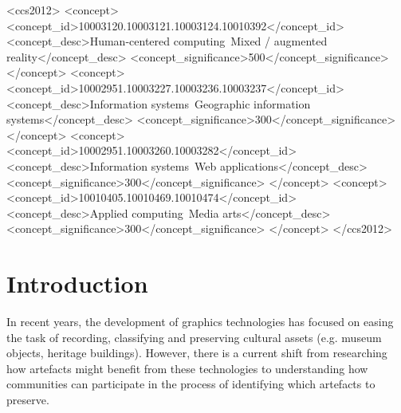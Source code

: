 \documentclass[acmlarge,screen,dvipsnames]{acmart}
\begin{document}
\begin{CCSXML} <ccs2012> <concept>
<concept_id>10003120.10003121.10003124.10010392</concept_id>
<concept_desc>Human-centered computing~Mixed / augmented
reality</concept_desc> <concept_significance>500</concept_significance>
</concept> <concept>
<concept_id>10002951.10003227.10003236.10003237</concept_id>
<concept_desc>Information systems~Geographic information
systems</concept_desc> <concept_significance>300</concept_significance>
</concept> <concept> <concept_id>10002951.10003260.10003282</concept_id>
<concept_desc>Information systems~Web applications</concept_desc>
<concept_significance>300</concept_significance> </concept> <concept>
<concept_id>10010405.10010469.10010474</concept_id> <concept_desc>Applied
computing~Media arts</concept_desc>
<concept_significance>300</concept_significance> </concept> </ccs2012>
\end{CCSXML}

  

\maketitle
\section{Introduction} In recent years, the development of graphics
technologies has focused on easing the task of recording, classifying and
preserving cultural assets (e.g. museum objects, heritage buildings). However,
there is a current shift from researching how artefacts might
benefit from these technologies to understanding how communities can
participate in the process of identifying which artefacts to preserve. 
\end{document}
